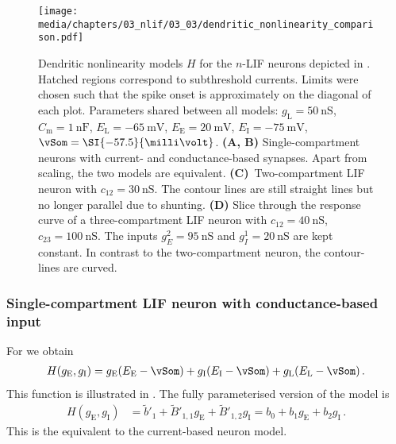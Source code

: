 \begin{figure}
	\texttt{[image: media/chapters/03\_nlif/03\_03/dendritic\_nonlinearity\_comparison.pdf]}%
	{\label{fig:dendritic_nonlinearity_comparison_a}}%
	{\label{fig:dendritic_nonlinearity_comparison_b}}%
	{\label{fig:dendritic_nonlinearity_comparison_c}}%
	{\label{fig:dendritic_nonlinearity_comparison_d}}%
	\caption[Dendritic nonlinearity models $H$ for different $n$-LIF neurons]{Dendritic nonlinearity models $H$ for the $n$-LIF neurons depicted in . Hatched regions correspond to subthreshold currents. Limits were chosen such that the spike onset is approximately on the diagonal of each plot.
	Parameters shared between all models: $g_\mathrm{L} = \SI{50}{\nano\siemens}$, $C_\mathrm{m} = \SI{1}{\nano\farad}$, $E_\mathrm{L} = \SI{-65}{\milli\volt}$, $E_\mathrm{E} = \SI{20}{\milli\volt}$, $E_\mathrm{I} = \SI{-75}{\milli\volt}$, $\vSom = \SI{-57.5}{\milli\volt}$.
	\textbf{(A, B)} Single-compartment neurons with current- and conductance-based synapses. Apart from scaling, the two models are equivalent.
	\textbf{(C)}~Two-compartment LIF neuron with $c_\mathrm{12} = \SI{30}{\nano\siemens}$. The contour lines are still straight lines but no longer parallel due to shunting.
	\textbf{(D)} Slice through the response curve of a three-compartment LIF neuron with $c_\mathrm{12} = \SI{40}{\nano\siemens}$, $c_\mathrm{23} = \SI{100}{\nano\siemens}$. The inputs $g_E^2 = \SI{95}{\nano\siemens}$ and $g_I^1 = \SI{20}{\nano\siemens}$ are kept constant. In contrast to the two-compartment neuron, the contour-lines are curved.
	}
\end{figure}


\subsubsection{Single-compartment LIF neuron with conductance-based input}
For  we obtain
\begin{align*}
	H(g_\mathrm{E}, g_\mathrm{I}) = g_\mathrm{E} (E_\mathrm{E} - \vSom) + g_\mathrm{I} (E_\mathrm{I} - \vSom) + g_\mathrm{L}(E_\mathrm{L} - \vSom) \,.
\end{align*}
This function is illustrated in .
The fully parameterised version of the model is
\begin{align*}
	H(g_\mathrm{E}, g_\mathrm{I}) &= \tilde b'_1 + \tilde B'_{1, 1} g_\mathrm{E} + \tilde B'_{1, 2} g_\mathrm{I} = b_0 + b_1 g_\mathrm{E} + b_2 g_\mathrm{I} \,.
\end{align*}
This is the equivalent to the current-based neuron model.

